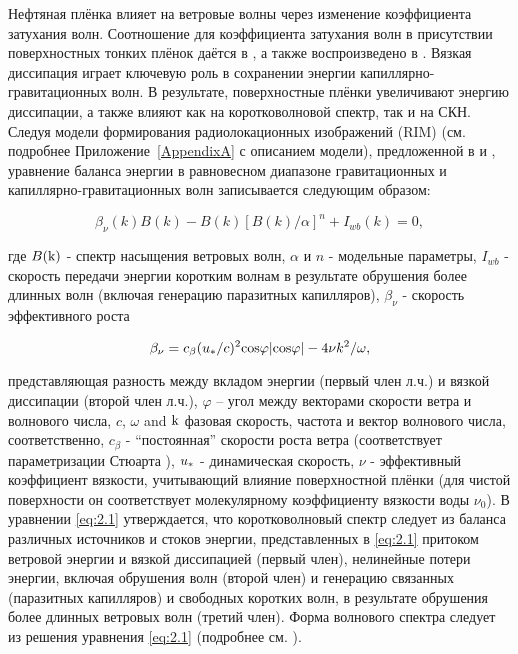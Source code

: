 Нефтяная плёнка влияет на ветровые волны через изменение коэффициента затухания волн. Соотношение для коэффициента затухания волн в присутствии поверхностных тонких плёнок даётся в \citep{Levich1962}, а также воспроизведено в \citep{Kudryavtsev2005}. Вязкая диссипация играет ключевую роль в сохранении энергии капиллярно-гравитационных волн. В результате, поверхностные плёнки увеличивают энергию диссипации, а также влияют как на коротковолновой спектр, так и на СКН. Следуя модели формирования радиолокационных изображений (RIM) (см. подробнее Приложение~\ref{AppendixA} с описанием модели), предложенной в \citep{Kudryavtsev2005} и \citep{Johannessen2005}, уравнение баланса энергии в равновесном диапазоне гравитационных и капиллярно-гравитационных волн записывается следующим образом:


\begin{equation} \label{eq:2.1}
\beta_{\nu }(k) B(k) - B(k) \left[ B(k) / \alpha \right]^n + I_{wb}(k) = 0 ,
\end{equation}


\noindent где $B({\rm k})$ - спектр насыщения ветровых волн, $\alpha $ и $n$ - модельные параметры, $I_{wb}^{} $ - скорость передачи энергии коротким волнам в результате обрушения более длинных волн (включая генерацию паразитных капилляров), $\beta_{\nu } $ - скорость эффективного роста



\begin{equation} \label{eq:2.2} 
\beta _{\nu } =c_{\beta } (u_{{\rm *}} /c)^{2} {\rm cos}\varphi |{\rm cos}\varphi |-4\nu k^{2} /\omega ,
\end{equation}


\noindent представляющая разность между вкладом энергии (первый член л.ч.) и вязкой диссипации (второй член л.ч.), $\varphi $ -- угол между векторами скорости ветра и волнового числа, $c$, $\omega $ and ${\rm k}$ фазовая скорость, частота и вектор волнового числа, соответственно, $c_{\beta } $ - ``постоянная'' скорости роста ветра (соответствует параметризации Стюарта \citep{Stewart1974}), $u_{{\rm *}} $ - динамическая скорость, $\nu $ - эффективный коэффициент вязкости, учитывающий влияние поверхностной плёнки (для чистой поверхности он соответствует молекулярному коэффициенту вязкости воды $\nu _{0} $). В уравнении \eqref{eq:2.1} утверждается, что коротковолновый спектр следует из баланса различных источников и стоков энергии, представленных в \eqref{eq:2.1} притоком ветровой энергии и вязкой диссипацией (первый член), нелинейные потери энергии, включая обрушения волн (второй член) и генерацию связанных (паразитных капилляров) и свободных коротких волн, в результате обрушения более длинных ветровых волн (третий член). Форма волнового спектра следует из решения уравнения \eqref{eq:2.1} (подробнее см. \citep{Kudryavtsev2005}).

